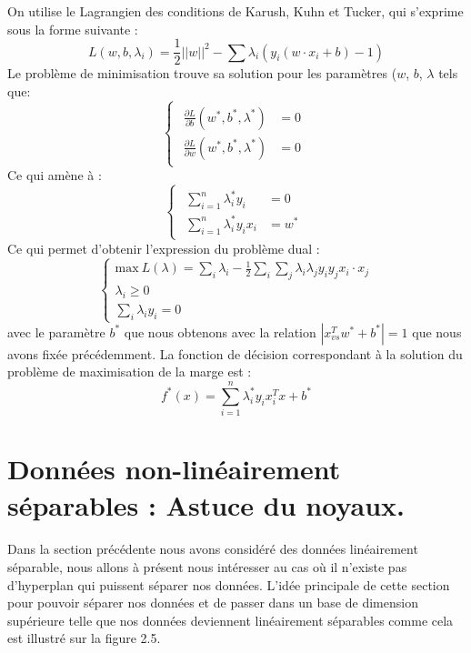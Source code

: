 \documentclass[a4paper,12pt,titlepage]{report}
\begin{document}
On utilise le Lagrangien des conditions de Karush, Kuhn et Tucker, qui s'exprime sous la forme suivante :
\[
L(w,b,\lambda_{i}) = \frac{1}{2}||w||^{2} - \sum{\lambda_{i}( y_i (w \cdot x_i + b)-1)}
\]
Le problème de minimisation trouve sa solution pour les paramètres ($w$, $b$, $\lambda$ tels que: 
\[
\left\{
	\begin{array}{cc}		
	\begin{aligned}
		\frac{\partial L}{\partial b}(w^*, b^* , \lambda^*) &= 0\\
		\frac{\partial L}{\partial w}(w^*, b^* , \lambda^*) &= 0
	\end{aligned}
\end{array}
	\right.
\]
Ce qui amène à :
\[
\left\{
	\begin{array}{cc}		
	\begin{aligned}
		\sum_{i=1}^{n}{\lambda^{*}_i y_i} &= 0\\
		\sum_{i=1}^{n}{\lambda^{*}_i y_i x_i} &= w^*
	\end{aligned}
\end{array}
	\right.
\]
Ce qui permet d'obtenir l'expression du problème dual :
\[
\left\{
\begin{array}{lll}
	\text{max}\ L(\lambda) = \sum_{i}{\lambda_{i}} - \frac{1}{2} \sum_{i}{\sum_{j}	{\lambda_{i} \lambda_{j} y_i y_j x_i \cdot x_j}} \\
 \lambda_i \geqslant 0 \\
 \sum_{i}\lambda_i y_i = 0 
\end{array}
\right.
\]
avec le paramètre $b^*$ que nous obtenons avec la relation $|x_{vs}^T w^*  + b^*| = 1$ que nous avons fixée précédemment.
La fonction de décision correspondant à la solution du problème de maximisation de la marge est :
\[
	f^* (x) = \sum_{i=1}^n {\lambda^*_i y_i x^T_i x + b^*}
\]

\section{Données non-linéairement séparables : Astuce du noyaux.}
\paragraph{}
Dans la section précédente nous avons considéré des données linéairement séparable,
nous allons à présent nous intéresser au cas où il n'existe pas d'hyperplan qui puissent séparer nos données. L'idée principale de cette section pour pouvoir séparer nos données et de passer dans un base de dimension supérieure telle que nos données deviennent linéairement séparables comme cela est illustré sur la figure 2.5.
\end{document}
